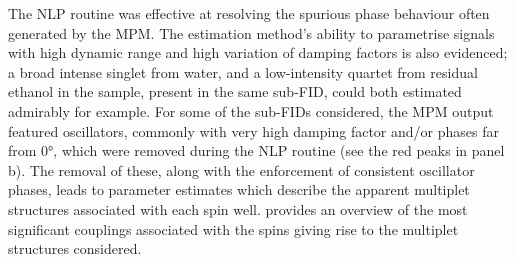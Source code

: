The \ac{NLP} routine was effective at resolving the spurious phase behaviour
often generated by the \ac{MPM}.
The estimation method's ability to parametrise signals with high
dynamic range and high variation of damping factors is also evidenced;
a broad intense singlet from water, and a low-intensity quartet from
residual ethanol in the sample, present in the same sub-\ac{FID}, could both
estimated admirably for example.
For some of the sub-\acp{FID} considered, the \ac{MPM} output featured
oscillators, commonly with very high damping factor and/or phases far from
\ang{0}, which were removed during the \ac{NLP} routine (see the red
peaks in panel b). The removal of these, along with the enforcement
of consistent oscillator phases, leads to parameter
estimates which describe the apparent multiplet structures associated with each
spin well.  provides an overview of the
most significant couplings associated with the spins giving rise to the
multiplet structures considered.

